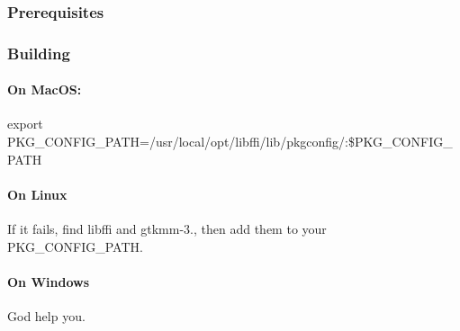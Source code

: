 \subsubsection*{Prerequisites}


\begin{DoxyCode}{0}
\end{DoxyCode}


\subsubsection*{Building}

\paragraph*{On Mac\+OS\+:}

{\ttfamily export P\+K\+G\+\_\+\+C\+O\+N\+F\+I\+G\+\_\+\+P\+A\+TH=/usr/local/opt/libffi/lib/pkgconfig/\+:\$\+P\+K\+G\+\_\+\+C\+O\+N\+F\+I\+G\+\_\+\+P\+A\+TH} \paragraph*{On Linux}

If it fails, find libffi and gtkmm-\/3., then add them to your P\+K\+G\+\_\+\+C\+O\+N\+F\+I\+G\+\_\+\+P\+A\+TH. \paragraph*{On Windows}

God help you. 